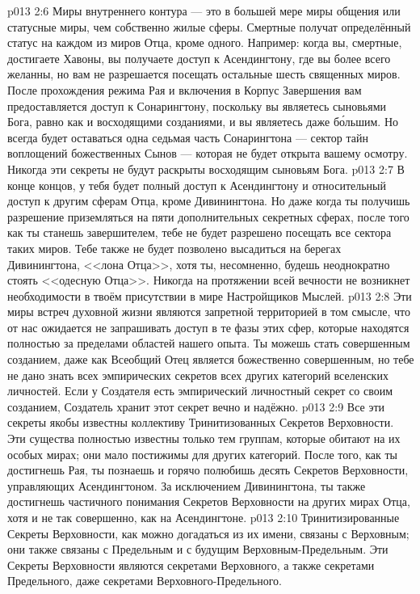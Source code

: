\vs p013 2:6 \pc Миры внутреннего контура --- это в большей мере миры общения или статусные миры, чем собственно жилые сферы. Смертные получат определённый статус на каждом из миров Отца, кроме одного. Например: когда вы, смертные, достигаете Хавоны, вы получаете доступ к Асендингтону, где вы более всего желанны, но вам не разрешается посещать остальные шесть священных миров. После прохождения режима Рая и включения в Корпус Завершения вам предоставляется доступ к Сонарингтону, поскольку вы являетесь сыновьями Бога, равно как и восходящими созданиями, и вы являетесь даже б\'ольшим. Но всегда будет оставаться одна седьмая часть Сонарингтона --- сектор тайн воплощений божественных Сынов --- которая не будет открыта вашему осмотру. Никогда эти секреты не будут раскрыты восходящим сыновьям Бога.
\vs p013 2:7 В конце концов, у тебя будет полный доступ к Асендингтону и относительный доступ к другим сферам Отца, кроме Дивинингтона. Но даже когда ты получишь разрешение приземляться на пяти дополнительных секретных сферах, после того как ты станешь завершителем, тебе не будет разрешено посещать все сектора таких миров. Тебе также не будет позволено высадиться на берегах Дивинингтона, <<лона Отца>>, хотя ты, несомненно, будешь неоднократно стоять <<одесную Отца>>. Никогда на протяжении всей вечности не возникнет необходимости в твоём присутствии в мире Настройщиков Мыслей.
\vs p013 2:8 Эти миры встреч духовной жизни являются запретной территорией в том смысле, что от нас ожидается не запрашивать доступ в те фазы этих сфер, которые находятся полностью за пределами областей нашего опыта. Ты можешь стать совершенным созданием, даже как Всеобщий Отец является божественно совершенным, но тебе не дано знать всех эмпирических секретов всех других категорий вселенских личностей. Если у Создателя есть эмпирический личностный секрет со своим созданием, Создатель хранит этот секрет вечно и надёжно.
\vs p013 2:9 \pc Все эти секреты якобы известны коллективу Тринитизованных Секретов Верховности. Эти существа полностью известны только тем группам, которые обитают на их особых мирах; они мало постижимы для других категорий. После того, как ты достигнешь Рая, ты познаешь и горячо полюбишь десять Секретов Верховности, управляющих Асендингтоном. За исключением Дивинингтона, ты также достигнешь частичного понимания Секретов Верховности на других мирах Отца, хотя и не так совершенно, как на Асендингтоне.
\vs p013 2:10 Тринитизированные Секреты Верховности, как можно догадаться из их имени, связаны с Верховным; они также связаны с Предельным и с будущим Верховным\hyp{}Предельным. Эти Секреты Верховности являются секретами Верховного, а также секретами Предельного, даже секретами Верховного\hyp{}Предельного.
